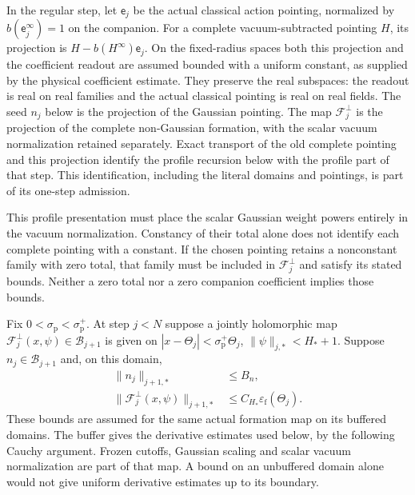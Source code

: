 \documentclass[11pt,letterpaper,reqno]{amsart}
\numberwithin{equation}{section}
\theoremstyle{definition}
\theoremstyle{remark}
\begin{document}
In the regular step, let $\mathsf e_j$ be the actual classical
action pointing, normalized by $b(\mathsf e_j^\infty)=1$ on the
companion. For a complete vacuum-subtracted pointing $H$, its
projection is $H-b(H^\infty)\mathsf e_j$. On the fixed-radius
spaces both this projection and the coefficient readout are assumed
bounded with a uniform constant, as supplied by the physical
coefficient estimate. They preserve the real subspaces: the readout
is real on real families and the actual classical pointing is real
on real fields. The seed $n_j$ below is the projection of
the Gaussian pointing. The map $\mathcal F_j^\perp$ is the
projection of the complete non-Gaussian formation, with the scalar
vacuum normalization retained separately. Exact transport of the
old complete pointing and this projection identify the profile
recursion below with the profile part of that step. This
identification, including the literal domains and pointings, is
part of its one-step admission.

This profile presentation must place the scalar Gaussian weight
powers entirely in the vacuum normalization. Constancy of their
total alone does not identify each complete pointing with a
constant. If the chosen pointing retains a nonconstant family
with zero total, that family must be included in
$\mathcal F_j^\perp$ and satisfy its stated bounds. Neither a
zero total nor a zero companion coefficient implies those bounds.

Fix $0<\sigma_{\mathrm p}<\sigma_{\mathrm p}^+$. At step $j<N$ suppose a jointly
holomorphic map $\mathcal F_j^{\perp}(x,\psi)\in\mathcal B_{j+1}$ is given on
$|x-\Theta_j|<\sigma_{\mathrm p}^+\Theta_j$, $\|\psi\|_{j,*}<H_*+1$.
Suppose $n_j\in\mathcal B_{j+1}$ and, on this domain,
\begin{equation}\label{em:eq-profile-formation}
 \begin{split}
 \|n_j\|_{j+1,*}&\le B_n,\\
 \|\mathcal F_j^{\perp}(x,\psi)\|_{j+1,*}
  &\le C_{H_*}\varepsilon_{\mathrm f}(\Theta_j).
 \end{split}
\end{equation}
These bounds are assumed for the same actual formation map on its
buffered domains. The buffer gives the derivative estimates used
below, by the following Cauchy argument. Frozen cutoffs, Gaussian
scaling and scalar vacuum normalization are part of that map.
A bound on an unbuffered domain alone would not give uniform
derivative estimates up to its boundary.
\end{document}
